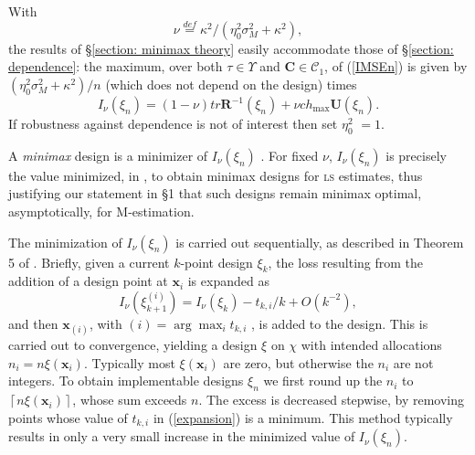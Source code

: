 \documentclass[times, authoryear, 12pt, twoside]{elsarticle}
\begin{document}
With 
\begin{equation}
\nu \overset{def}{=}\kappa ^{2}/\left( \eta _{0}^{2}\sigma _{M}^{2}+\kappa
^{2}\right) ,  \label{nu}
\end{equation}%
the results of \S \ref{section: minimax theory} easily accommodate those of 
\S \ref{section: dependence}: the maximum, over both $\tau \in \Upsilon $
and $\boldsymbol{C}\in \mathcal{C}_{1}$, of (\ref{IMSEn}) is given by $\left( \eta _{0}^{2}\sigma _{M}^{2}+\kappa
^{2}\right) /n$ (which does not depend on the design) times%
\begin{equation}
I_{\nu }\left( \xi _{n}\right) =\left( 1-\nu \right) tr\boldsymbol{R}%
^{-1}\left( \xi _{n}\right) +\nu ch_{\max }\boldsymbol{U}\left( \xi
_{n}\right) .  \label{Inu}
\end{equation}%
If robustness against
dependence is not of interest then set $\eta _{0}^{2}$ $=1$.

A \textit{minimax} design is a minimizer of $I_{\nu }\left( \xi _{n}\right) $%
. For fixed $\nu $, $I_{\nu }\left( \xi _{n}\right) $ is precisely the value
minimized, in \cite{w}, to obtain minimax designs for \textsc{ls} estimates,
thus justifying our statement in \S 1 that such designs remain minimax
optimal, asymptotically, for M-estimation.

The minimization of $I_{\nu }\left( \xi _{n}\right) $ is carried out
sequentially, as described in Theorem 5 of \cite{w}. Briefly, given a
current $k$-point design $\xi _{k}$, the loss resulting from the addition of
a design point at $\boldsymbol{x}_{i}$ is expanded as 
\begin{equation}
I_{\nu }\left( \xi _{k+1}^{(i)}\right) =I_{\nu }\left( \xi _{k}\right)
-t_{k,i}/k+O\left( k^{-2}\right) ,  \label{expansion}
\end{equation}%
and then $\boldsymbol{x}_{(i)}$, with $\left( i\right) =\arg \max_{i}t_{k,i}$%
, is added to the design. This is carried out to convergence, yielding a
design $\xi $ on $\mathcal{\chi }$ with intended allocations $n_{i}=n\xi
\left( \boldsymbol{x}_{i}\right) $. Typically most $%
\xi \left( \boldsymbol{x}_{i}\right) $ are zero, but otherwise the $n_{i}$
are not integers. To obtain implementable designs $\xi_{n}$ we first round up the $%
n_{i}$ to $\left\lceil n\xi \left( \boldsymbol{x}_{i}\right) \right\rceil $,
whose sum exceeds $n$. The excess is decreased stepwise, by removing points
whose value of $t_{k,i}$ in (\ref{expansion}) is a minimum. This method
typically results in only a very small increase in the minimized value of $%
I_{\nu }\left( \xi _{n}\right) $.
\end{document}
